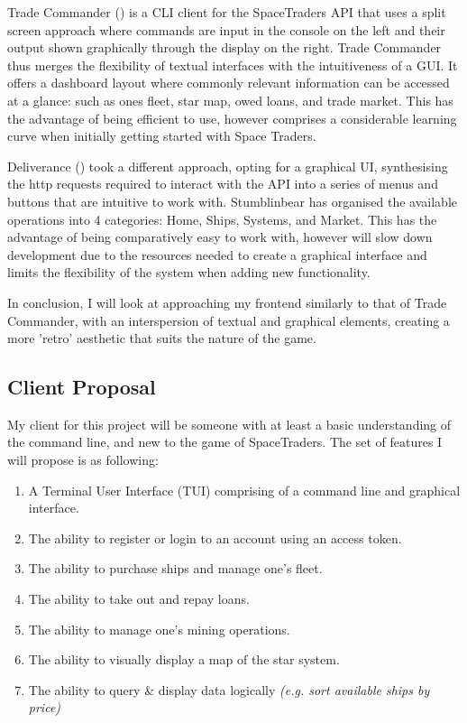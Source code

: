 
Trade Commander (\textcite{tradecommander}) is a CLI client for the SpaceTraders API that uses a split screen approach where commands are input in the console on the left and their output shown graphically through the display on the right. Trade Commander thus merges the flexibility of textual interfaces with the intuitiveness of a GUI. It offers a dashboard layout where commonly relevant information can be accessed at a glance: such as ones fleet, star map, owed loans, and trade market. This has the advantage of being efficient to use, however comprises a considerable learning curve when initially getting started with Space Traders.  

\bigskip
{}

Deliverance (\textcite{deliverance}) took a different approach, opting for a graphical UI, synthesising the http requests required to interact with the API into a series of menus and buttons that are intuitive to work with. Stumblinbear has organised the available operations into 4 categories: Home, Ships, Systems, and Market. This has the advantage of being comparatively easy to work with, however will slow down development due to the resources needed to create a graphical interface and limits the flexibility of the system when adding new functionality.

In conclusion, I will look at approaching my frontend similarly to that of Trade Commander, with an interspersion of textual and graphical elements, creating a more 'retro' aesthetic that suits the nature of the game. 

\subsection{Client Proposal}
My client for this project will be someone with at least a basic understanding of the command line, and new to the game of SpaceTraders. The set of features I will propose is as following:
\begin{enumerate}
    \item A Terminal User Interface (TUI) comprising of a command line and graphical interface.
    \item The ability to register or login to an account using an access token.
    \item The ability to purchase ships and manage one's fleet.
    \item The ability to take out and repay loans.
    \item The ability to manage one's mining operations.
    \item The ability to visually display a map of the star system.
    \item The ability to query \& display data logically \textit{(e.g. sort available ships by price)}
\end{enumerate}

